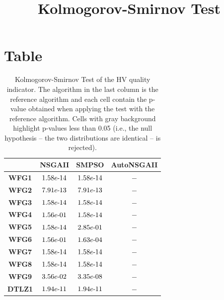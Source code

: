 \documentclass{article}
\title{Kolmogorov-Smirnov Test}
\author{}
\begin{document}
\maketitle
\section{Table}
\begin{table}[!htp]
  \caption{Kolmogorov-Smirnov Test of the HV quality indicator. The algorithm in the last column is the reference algorithm and each cell contain the p-value obtained when applying the test with the reference algorithm. Cells with gray background highlight p-values less than 0.05 (i.e., the null hypothesis -- the two distributions are identical -- is rejected).}
  \label{table:HV}
  \centering
  \begin{tiny}
  \begin{tabular}{c|ccc}
      & \textbf{NSGAII} & \textbf{SMPSO} & \textbf{AutoNSGAII} \\\hline
\textbf{WFG1} & $\cellcolor{gray25} 1.58e\makebox[0.1cm]{-}14 $ & $ \cellcolor{gray25} 1.58e\makebox[0.1cm]{-}14 $ & $ -$ \\
\textbf{WFG2} & $\cellcolor{gray25} 7.91e\makebox[0.1cm]{-}13 $ & $ \cellcolor{gray25} 7.91e\makebox[0.1cm]{-}13 $ & $ -$ \\
\textbf{WFG3} & $\cellcolor{gray25} 1.58e\makebox[0.1cm]{-}14 $ & $ \cellcolor{gray25} 1.58e\makebox[0.1cm]{-}14 $ & $ -$ \\
\textbf{WFG4} & $1.56e\makebox[0.1cm]{-}01 $ & $ \cellcolor{gray25} 1.58e\makebox[0.1cm]{-}14 $ & $ -$ \\
\textbf{WFG5} & $\cellcolor{gray25} 1.58e\makebox[0.1cm]{-}14 $ & $ 2.85e\makebox[0.1cm]{-}01 $ & $ -$ \\
\textbf{WFG6} & $1.56e\makebox[0.1cm]{-}01 $ & $ \cellcolor{gray25} 1.63e\makebox[0.1cm]{-}04 $ & $ -$ \\
\textbf{WFG7} & $\cellcolor{gray25} 1.58e\makebox[0.1cm]{-}14 $ & $ \cellcolor{gray25} 1.58e\makebox[0.1cm]{-}14 $ & $ -$ \\
\textbf{WFG8} & $\cellcolor{gray25} 1.58e\makebox[0.1cm]{-}14 $ & $ \cellcolor{gray25} 1.58e\makebox[0.1cm]{-}14 $ & $ -$ \\
\textbf{WFG9} & $\cellcolor{gray25} 3.56e\makebox[0.1cm]{-}02 $ & $ \cellcolor{gray25} 3.35e\makebox[0.1cm]{-}08 $ & $ -$ \\
\textbf{DTLZ1} & $\cellcolor{gray25} 1.94e\makebox[0.1cm]{-}11 $ & $ \cellcolor{gray25} 1.94e\makebox[0.1cm]{-}11 $ & $ -$ \\

\end{tabular}
\end{tiny}
\end{table}
\end{document}
